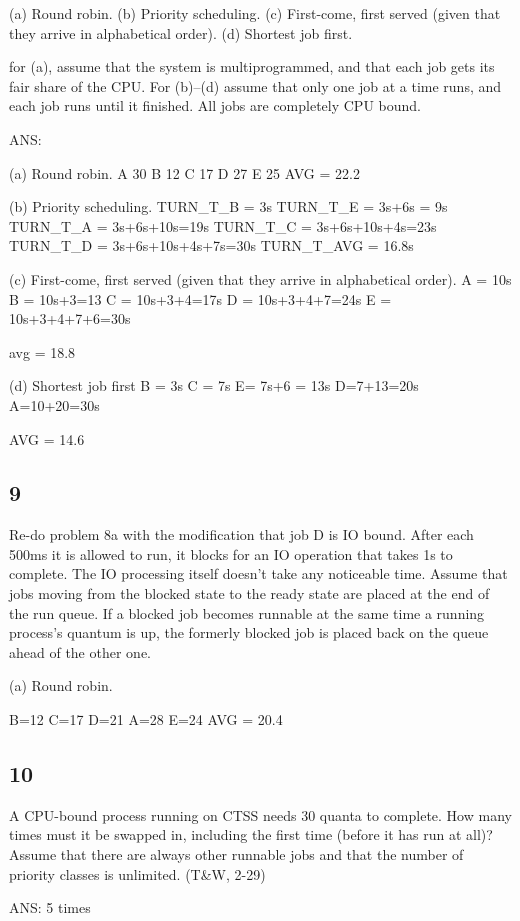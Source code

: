 \documentclass[11pt]{article}
\begin{document}
(a) Round robin.
(b) Priority scheduling.
(c) First-come, first served (given that they arrive in alphabetical order).
(d) Shortest job first.

for (a), assume that the system is multiprogrammed, and that each job gets its fair share of
the CPU. For (b)–(d) assume that only one job at a time runs, and each job runs until it
finished. All jobs are completely CPU bound.

ANS:


(a) Round robin.
A 30
B 12
C 17
D 27
E 25
AVG = 22.2


(b) Priority scheduling.
TURN_T_B = 3s
TURN_T_E = 3s+6s = 9s
TURN_T_A = 3s+6s+10s=19s
TURN_T_C = 3s+6s+10s+4s=23s
TURN_T_D = 3s+6s+10s+4s+7s=30s
TURN_T_AVG = 16.8s


(c) First-come, first served (given that they arrive in alphabetical order).
A = 10s
B = 10s+3=13
C = 10s+3+4=17s
D = 10s+3+4+7=24s
E = 10s+3+4+7+6=30s

avg = 18.8


(d) Shortest job first
B = 3s
C = 7s
E= 7s+6 = 13s
D=7+13=20s
A=10+20=30s

AVG = 14.6


\subsection{9}
Re-do problem 8a with the modification that job D is IO bound. After each 500ms it is allowed
to run, it blocks for an IO operation that takes 1s to complete. The IO processing itself doesn’t
take any noticeable time. Assume that jobs moving from the blocked state to the ready state
are placed at the end of the run queue. If a blocked job becomes runnable at the same time a
running process’s quantum is up, the formerly blocked job is placed back on the queue ahead
of the other one.

(a) Round robin.

B=12
C=17
D=21
A=28
E=24
AVG = 20.4


\subsection{10}
A CPU-bound process running on CTSS needs 30 quanta to complete. How many times must
it be swapped in, including the first time (before it has run at all)? Assume that there are
always other runnable jobs and that the number of priority classes is unlimited. (T&W, 2-29)

ANS:
    5 times
\end{document}
